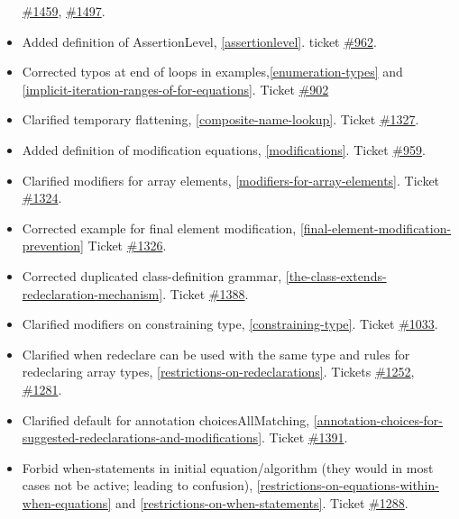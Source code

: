 \begin{itemize}
  \href{https://trac.modelica.org/Modelica/ticket/1459}{\#1459},
  \href{https://trac.modelica.org/Modelica/ticket/1497}{\#1497}.
\item
  Added definition of AssertionLevel, \ref{assertionlevel}. ticket
  \href{https://trac.modelica.org/Modelica/ticket/962}{\#962}.
\item
  Corrected typos at end of loops in examples,\ref{enumeration-types} and
  \ref{implicit-iteration-ranges-of-for-equations}. Ticket
  \href{https://trac.modelica.org/Modelica/ticket/902}{\#902}
\item
  Clarified temporary flattening, \ref{composite-name-lookup}. Ticket
  \href{https://trac.modelica.org/Modelica/ticket/1327}{\#1327}.
\item
  Added definition of modification equations, \ref{modifications}. Ticket
  \href{https://trac.modelica.org/Modelica/ticket/959}{\#959}.
\item
  Clarified modifiers for array elements, \ref{modifiers-for-array-elements}. Ticket
  \href{https://trac.modelica.org/Modelica/ticket/1324}{\#1324}.
\item
  Corrected example for final element modification, \ref{final-element-modification-prevention}
  Ticket \href{https://trac.modelica.org/Modelica/ticket/1326}{\#1326}.
\item
  Corrected duplicated class-definition grammar, \ref{the-class-extends-redeclaration-mechanism}. Ticket
  \href{https://trac.modelica.org/Modelica/ticket/1388}{\#1388}.
\item
  Clarified modifiers on constraining type, \ref{constraining-type}. Ticket
  \href{https://trac.modelica.org/Modelica/ticket/1033}{\#1033}.
\item
  Clarified when redeclare can be used with the same type and rules for
  redeclaring array types, \ref{restrictions-on-redeclarations}. Tickets
  \href{https://trac.modelica.org/Modelica/ticket/1252}{\#1252},
  \href{https://trac.modelica.org/Modelica/ticket/1281}{\#1281}.
\item
  Clarified default for annotation choicesAllMatching, \ref{annotation-choices-for-suggested-redeclarations-and-modifications}.
  Ticket \href{https://trac.modelica.org/Modelica/ticket/1391}{\#1391}.
\item
  Forbid when-statements in initial equation/algorithm (they would in
  most cases not be active; leading to confusion), \ref{restrictions-on-equations-within-when-equations} and
  \ref{restrictions-on-when-statements}. Ticket
  \href{https://trac.modelica.org/Modelica/ticket/1288}{\#1288}.

\end{itemize}
